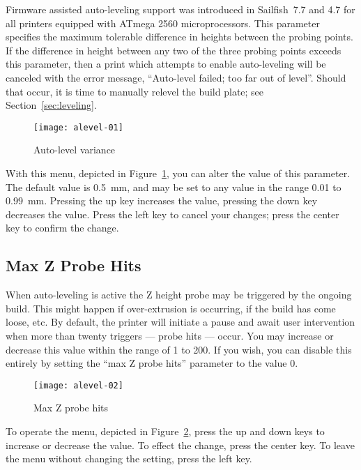 Firmware assisted auto-leveling support was introduced in Sailfish~7.7 and 4.7 for all printers equipped with ATmega 2560 microprocessors.  This parameter specifies the maximum tolerable difference in heights between the probing points.  If the difference in height between any two of the three probing points exceeds this parameter, then a print which attempts to enable auto-leveling will be canceled with the error message, ``Auto-level failed; too far out of level''.  Should that occur, it is time to manually relevel the build plate; see Section~\ref{sec:leveling}.

\begin{figure}[!htbp]
  \centering
    \texttt{[image: alevel-01]}
    \caption{Auto-level variance}
  \label{fig:alevel-variance}
\end{figure}

With this menu, depicted in Figure~\ref{fig:alevel-variance}, you can alter the value of this parameter.  The default value is 0.5~mm, and may be set to any value in the range 0.01 to 0.99~mm.  Pressing the up key increases the value, pressing the down key decreases the value.  Press the left key to cancel your changes; press the center key to confirm the change.


\subsection{Max Z Probe Hits} \label{sec:alevel-maxhits}

When auto-leveling is active the Z height probe may be triggered by the ongoing build.  This might happen if over-extrusion is occurring, if the build has come loose, etc.  By default, the printer will initiate a pause and await user intervention when more than twenty triggers --- probe hits --- occur.  You may increase or decrease this value within the range of 1 to 200.  If you wish, you can disable this entirely by setting the ``max Z probe hits'' parameter to the value 0.  

\begin{figure}[!htbp]
  \centering
    \texttt{[image: alevel-02]}
    \caption{Max Z probe hits}
  \label{fig:alevel-maxhits}
\end{figure}

To operate the menu, depicted in Figure~\ref{fig:alevel-maxhits}, press the up and down keys to increase or decrease the value.  To effect the change, press the center key.  To leave the menu without changing the setting, press the left key.

